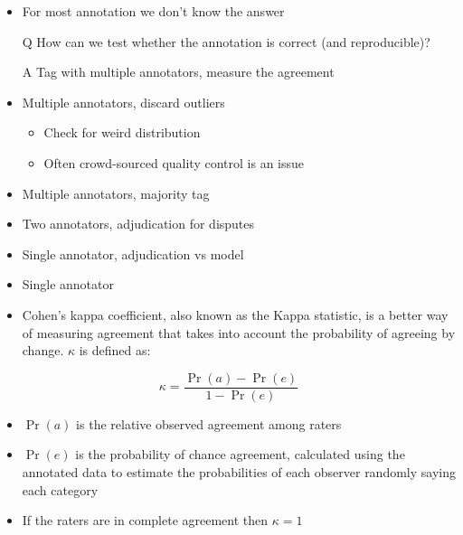 \documentclass[a4paper,landscape,headrule,footrule,xetex]{foils}
\begin{document}
\begin{itemize}
\item For most annotation we don't know the answer
\item[Q] How can we test whether the annotation is correct (and reproducible)?
\item[A] Tag with multiple annotators, measure the agreement

\end{itemize}


\begin{itemize}
\item Multiple annotators, discard outliers
  \begin{itemize}
  \item Check for weird distribution
  \item Often crowd-sourced quality control is an issue
  \end{itemize}
\item Multiple annotators, majority tag
\item Two annotators, adjudication for disputes
\item Single annotator, adjudication vs model
\item Single annotator
\end{itemize}


\begin{itemize}
\item Cohen's kappa coefficient, also known as the Kappa statistic, is a better way of measuring agreement that takes into account the probability of agreeing by change.  $\kappa$ is defined as:
\end{itemize}
\begin{equation}
  \label{eq:1}
  \kappa = \frac{\Pr(a) - \Pr(e)}{1 - \Pr(e)}
\end{equation}

\begin{itemize}
\item $\Pr(a)$ is the relative observed agreement among raters
\item $\Pr(e)$ is the probability of chance agreement, calculated using
the annotated data to estimate the probabilities of each observer
randomly saying each category
\item If the raters are in complete agreement then $\kappa = 1$
\end{itemize}
\end{document}

